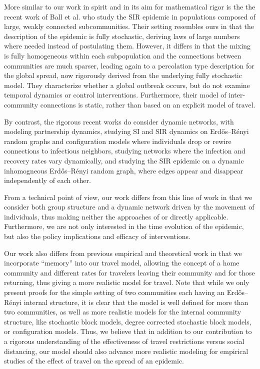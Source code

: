 \documentclass[11pt]{article}
\begin{document}
More similar to our work in spirit and in its aim for mathematical rigor is the  
the recent work of Ball et al. \cite{ball2024sir} who study the SIR epidemic in populations composed of large, weakly connected subcommunities.
Their setting resembles ours in that the description of the epidemic is fully stochastic, deriving laws of large numbers where needed instead of postulating them. However, it differs in that the mixing is fully homogeneous within each subpopulation and the connections between communities are much sparser, leading again to a percolation type description for the global spread, now rigorously derived from the underlying fully stochastic model. They characterize whether a global outbreak occurs, but do not examine temporal dynamics or control interventions. Furthermore, their model of inter-community connections is static, rather than based on an explicit model of travel.

By contrast, the rigorous recent works
\cite{lashari2018branching, britton2019preventive, durrett2019sir, ball2020epidemics, durrett2022evoSI, cocomello2023sirSEIR, huang2024sir} do consider dynamic networks, with \cite{lashari2018branching} modeling partnership dynamics, \cite{britton2019preventive, durrett2019sir, ball2020epidemics, durrett2022evoSI} studying SI and SIR dynamics on Erd\H{o}s--R\'enyi random graphs and configuration models where individuals drop or rewire connections to infectious neighbors,  \cite{cocomello2023sirSEIR} studying networks where the infection and recovery rates vary dynamically, and \cite{huang2024sir} studying the SIR epidemic on a dynamic inhomogneous Erd\H{o}s--R\'enyi random graph, where edges appear and disappear independently of each other.


From a technical point of view, our work differs from this line of work in that we consider both group structure and 
a dynamic network driven by the movement of individuals, thus making neither the approaches of \cite{britton2019preventive, durrett2019sir, ball2020epidemics, durrett2022evoSI} or \cite{lashari2018branching, cocomello2023sirSEIR, huang2024sir} directly applicable.  Furthermore, we are not only interested in the time evolution of the epidemic, but also the policy implications and efficacy of interventions.  

Our work also differs from previous empirical and theoretical work in that we incorporate ``memory'' into our travel model, allowing the concept of a home community and different rates for travelers leaving their community and for those returning, thus giving a more realistic model for travel.  Note that while we only present proofs for the simple setting of two communities each having an Erd\H{o}s--R\'enyi internal structure, it is clear that the model is well defined for more than two communities, as well as more realistic models for the internal community structure, like stochastic block models, degree corrected stochastic block models, or configuration models. Thus, we believe that in addition to our contribution to a rigorous understanding of the effectiveness of travel restrictions versus social distancing, our model should also advance more realistic modeling for empirical studies of the effect of travel on the spread of an epidemic.
\end{document}

